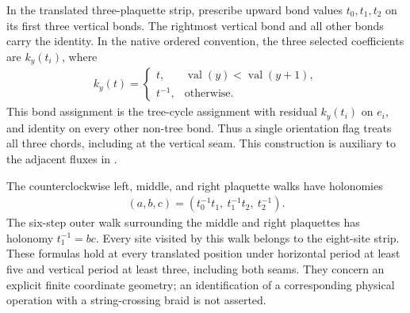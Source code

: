 \begin{definition}%
    \label{def:peps_torus_three_plaquette_flux_assignment}
    \leanok
    In the translated three-plaquette strip, prescribe upward
    bond values $t_0,t_1,t_2$ on its first three vertical bonds. The rightmost
    vertical bond and all other bonds carry the identity.
    In the native ordered convention, the three selected coefficients are
    $k_y(t_i)$, where
    \begin{align}
        k_y(t)=
        \begin{cases}
            t,      & \operatorname{val}(y)<\operatorname{val}(y+1), \\
            t^{-1}, & \text{otherwise}.
        \end{cases}
    \end{align}
    This bond assignment is the tree-cycle assignment with
    residual $k_y(t_i)$ on $e_i$, and identity on every other non-tree bond.
    Thus a single orientation flag treats all three chords, including
    at the vertical seam. This construction is auxiliary to the adjacent
    fluxes in \cite[braiding passage]{Schuch2010PEPS}.
\end{definition}

\begin{lemma}%
    \label{thm:peps_torus_three_plaquette_flux_holonomy}
    \leanok
    The counterclockwise left, middle, and right plaquette walks
    have holonomies
    \begin{align}
        (a,b,c)=(t_0^{-1}t_1,\ t_1^{-1}t_2,\ t_2^{-1}).
    \end{align}
    The six-step outer walk surrounding the middle and right plaquettes
    has holonomy $t_1^{-1}=bc$. Every site visited by this walk belongs
    to the eight-site strip. These formulas hold at every translated
    position under horizontal period at least five and vertical period at
    least three, including both seams.
    They concern an explicit finite coordinate geometry; an identification
    of a corresponding physical operation with a string-crossing braid is
    not asserted.
\end{lemma}

